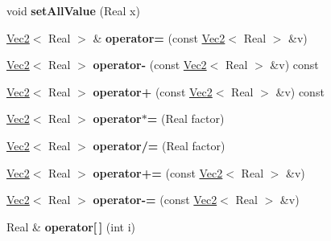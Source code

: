 \begin{DoxyCompactItemize}
\item 
\hypertarget{classVec2_a4787e37be4d7b7b0a480b86a526c2ed2}{void {\bfseries set\+All\+Value} (Real x)}\label{classVec2_a4787e37be4d7b7b0a480b86a526c2ed2}

\item 
\hypertarget{classVec2_a078a13ddc3d13295191d809d09eb9b14}{\hyperlink{classVec2}{Vec2}$<$ Real $>$ \& {\bfseries operator=} (const \hyperlink{classVec2}{Vec2}$<$ Real $>$ \&v)}\label{classVec2_a078a13ddc3d13295191d809d09eb9b14}

\item 
\hypertarget{classVec2_a89710b8a29e73d8d0ffa682b477f2801}{\hyperlink{classVec2}{Vec2}$<$ Real $>$ {\bfseries operator-\/} (const \hyperlink{classVec2}{Vec2}$<$ Real $>$ \&v) const }\label{classVec2_a89710b8a29e73d8d0ffa682b477f2801}

\item 
\hypertarget{classVec2_a1de2fbafcec042d7f0a3ebb3d6b115c3}{\hyperlink{classVec2}{Vec2}$<$ Real $>$ {\bfseries operator+} (const \hyperlink{classVec2}{Vec2}$<$ Real $>$ \&v) const }\label{classVec2_a1de2fbafcec042d7f0a3ebb3d6b115c3}

\item 
\hypertarget{classVec2_a3e1a9ddc8c16db9abd5ef9307501df47}{\hyperlink{classVec2}{Vec2}$<$ Real $>$ {\bfseries operator$\ast$=} (Real factor)}\label{classVec2_a3e1a9ddc8c16db9abd5ef9307501df47}

\item 
\hypertarget{classVec2_ab028dc151ac407e42a9376a54192c157}{\hyperlink{classVec2}{Vec2}$<$ Real $>$ {\bfseries operator/=} (Real factor)}\label{classVec2_ab028dc151ac407e42a9376a54192c157}

\item 
\hypertarget{classVec2_a23224b7b8f00b92b7c95109b83045dad}{\hyperlink{classVec2}{Vec2}$<$ Real $>$ {\bfseries operator+=} (const \hyperlink{classVec2}{Vec2}$<$ Real $>$ \&v)}\label{classVec2_a23224b7b8f00b92b7c95109b83045dad}

\item 
\hypertarget{classVec2_a2e1ca7f0f90b6e92fe2929eb42984dfa}{\hyperlink{classVec2}{Vec2}$<$ Real $>$ {\bfseries operator-\/=} (const \hyperlink{classVec2}{Vec2}$<$ Real $>$ \&v)}\label{classVec2_a2e1ca7f0f90b6e92fe2929eb42984dfa}

\item 
\hypertarget{classVec2_af8b20e5d74ecc6104aa15f0be04d9a92}{Real \& {\bfseries operator\mbox{[}$\,$\mbox{]}} (int i)}\label{classVec2_af8b20e5d74ecc6104aa15f0be04d9a92}


\end{DoxyCompactItemize}
